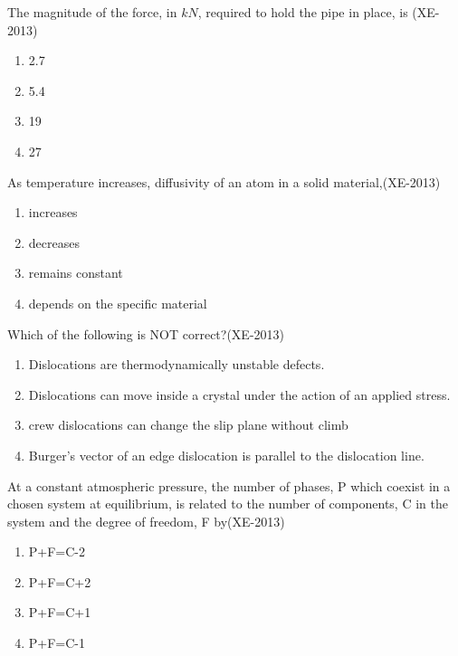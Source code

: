     \item The magnitude of the force, in $kN$, required to hold the pipe in place, is \hfill(XE-2013)
    \begin{multicols}{4}
        \begin{enumerate}
            \item 2.7
            \item 5.4
            \item 19
            \item 27
        \end{enumerate}
    \end{multicols}





    

\item As temperature increases, diffusivity of an atom in a solid material,\hfill(XE-2013)
\begin{enumerate}
    \item increases
    \item decreases
    \item remains constant
    \item depends on the specific material
\end{enumerate}
\item Which of the following is NOT correct?\hfill(XE-2013)
\begin{enumerate}
    \item Dislocations are thermodynamically unstable defects.
    \item Dislocations can move inside a crystal under the action of an applied stress.
    \item crew dislocations can change the slip plane without climb
    \item Burger's vector of an edge dislocation is parallel to the dislocation line.
    
\end{enumerate}
\item At a constant atmospheric pressure, the number of phases, P which coexist in a chosen system at equilibrium, is related to the number of components, C in the system and the degree of freedom, F
by\hfill(XE-2013)
\begin{enumerate}
    \item P+F=C-2
    \item P+F=C+2
    \item P+F=C+1
    \item P+F=C-1
\end{enumerate}
